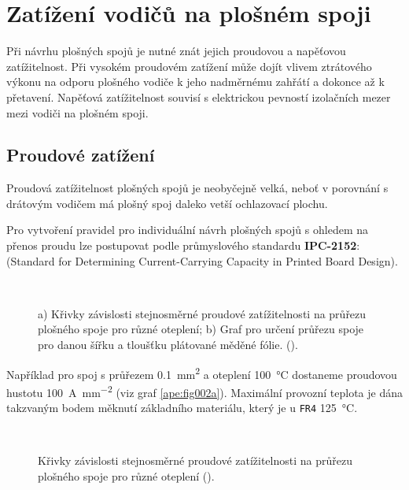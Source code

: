 \section{Zatížení vodičů na plošném spoji}
  Při návrhu plošných spojů je nutné znát jejich proudovou a napěťovou zatížitelnost. Při
  vysokém proudovém zatížení může dojít vlivem ztrátového výkonu na odporu plošného
  vodiče k jeho nadměrnému zahřátí a dokonce až k přetavení. Napěťová zatížitelnost souvisí
  s elektrickou pevností izolačních mezer mezi vodiči na plošném spoji.
  
  \subsection{Proudové zatížení}
    Proudová zatížitelnost plošných spojů je neobyčejně velká, neboť v porovnání s drátovým
    vodičem má plošný spoj daleko vetší ochlazovací plochu. 
    
    Pro vytvoření pravidel pro individuální návrh plošných spojů s ohledem na přenos proudu lze 
    postupovat podle průmyslového standardu \textbf{IPC-2152}: (Standard for Determining 
    Current-Carrying Capacity in Printed Board Design).  

    \begin{figure}[ht!] %
      \centering
        \\
      \caption{a) Křivky závislosti stejnosměrné proudové zatížitelnosti na průřezu plošného spoje 
               pro různé oteplení; b) Graf pro určení průřezu spoje pro danou šířku a tloušťku 
               plátované měděné fólie.
               (\cite[s.~9]{IPC2152}).}
      \label{ape:fig002}
    \end{figure}
    
    Například pro spoj s průřezem \SI{0.1}{\mm\squared} a oteplení \SI{100}{\degreeCelsius} 
    dostaneme proudovou hustotu \SI{100}{\A\per\mm\squared} (viz graf \ref{ape:fig002a}). Maximální 
    provozní teplota je dána takzvaným bodem měknutí základního materiálu, který je u \texttt{FR4} 
    \SI{125}{\degreeCelsius}. 
    
   
    \begin{figure}[ht!] %
      \centering
                                  \\
      \caption{Křivky závislosti stejnosměrné proudové zatížitelnosti na průřezu plošného spoje 
                pro různé oteplení (\cite[s.~10]{IPC2152}).}
      \label{ape:fig003}
    \end{figure}

